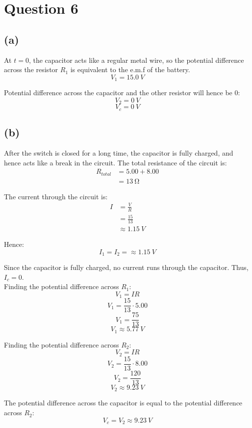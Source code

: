 \documentclass[11pt]{article}
\begin{document}
\section{Question 6}
\label{sec:org678a327}

\subsection{(a)}
\label{sec:orgaa54b0c}
At \(t = 0\), the capacitor acts like a regular metal wire, so the potential difference across the resistor \(R_1\) is equivalent to the e.m.f of the battery.
\[V_1 = \qty{15.0}{\unit{V}}\]

Potential difference across the capacitor and the other resistor will hence be 0:
\[V_2 = \qty{0}{\unit{V}}\]
\[V_c = \qty{0}{\unit{V}}\]

\subsection{(b)}
\label{sec:orgc17ec15}
After the switch is closed for a long time, the capacitor is fully charged, and hence acts like a break in the circuit. The total resistance of the circuit is:
\begin{align*}
R_{total} &= 5.00 + 8.00 \\
&= \qty{13}{\unit{\ohm}}
\end{align*}

The current through the circuit is:
\begin{align*}
I &= \frac{V}{R} \\
&= \frac{15}{13} \\
&\approx \qty{1.15}{\unit{V}}
\end{align*}

Hence:
\[I_1 = I_2 = \approx \qty{1.15}{\unit{V}}\]

Since the capacitor is fully charged, no current runs through the capacitor. Thus, \(I_c = 0\).
\\[0pt]

Finding the potential difference across \(R_1\):
\[V_1 = IR\]
\[V_1 = \frac{15}{13} \cdot 5.00\]
\[V_1 = \frac{75}{13}\]
\[V_1 \approx \qty{5.77}{\unit{V}}\]

Finding the potential difference across \(R_2\):
\[V_2 = IR\]
\[V_2 = \frac{15}{13} \cdot 8.00\]
\[V_2 = \frac{120}{13}\]
\[V_2 \approx \qty{9.23}{\unit{V}}\]

The potential difference across the capacitor is equal to the potential difference across \(R_2\):
\[V_c = V_2 \approx \qty{9.23}{\unit{V}}\]
\end{document}

